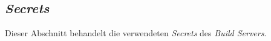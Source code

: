 \subsection{\emph{Secrets}}
\label{sec:buildserver-secrets}
Dieser Abschnitt behandelt die verwendeten \emph{Secrets} des \emph{Build Servers}.